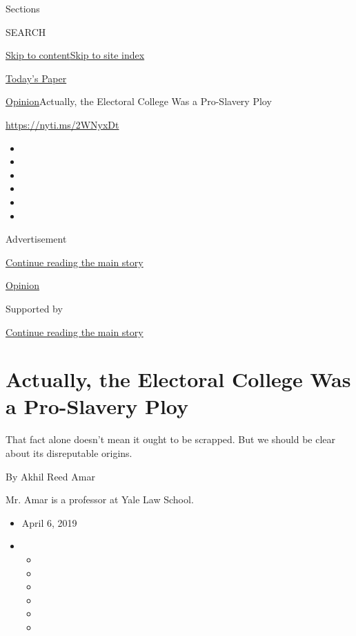 Sections

SEARCH

\protect\hyperlink{site-content}{Skip to
content}\protect\hyperlink{site-index}{Skip to site index}

\href{https://myaccount.nytimes.com/auth/login?response_type=cookie\&client_id=vi}{}

\href{https://www.nytimes.com/section/todayspaper}{Today's Paper}

\href{/section/opinion}{Opinion}\textbar{}Actually, the Electoral
College Was a Pro-Slavery Ploy

\url{https://nyti.ms/2WNyxDt}

\begin{itemize}
\item
\item
\item
\item
\item
\item
\end{itemize}

Advertisement

\protect\hyperlink{after-top}{Continue reading the main story}

\href{/section/opinion}{Opinion}

Supported by

\protect\hyperlink{after-sponsor}{Continue reading the main story}

\hypertarget{actually-the-electoral-college-was-a-pro-slavery-ploy}{%
\section{Actually, the Electoral College Was a Pro-Slavery
Ploy}\label{actually-the-electoral-college-was-a-pro-slavery-ploy}}

That fact alone doesn't mean it ought to be scrapped. But we should be
clear about its disreputable origins.

By Akhil Reed Amar

Mr. Amar is a professor at Yale Law School.

\begin{itemize}
\item
  April 6, 2019
\item
  \begin{itemize}
  \item
  \item
  \item
  \item
  \item
  \item
  \end{itemize}
\end{itemize}

